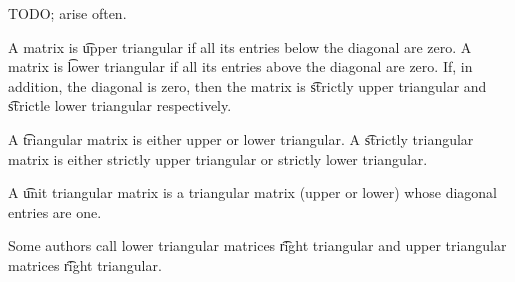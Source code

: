 
\sbasic































\sstart
{}


TODO;
arise often.


A matrix is \t{upper triangular} if all its entries below the diagonal are zero.
A matrix is \t{lower triangular} if all its entries above the diagonal are zero.
If, in addition, the diagonal is zero, then the matrix is \t{strictly upper triangular} and \t{strictle lower triangular} respectively.

A \t{triangular} matrix is either upper or lower triangular.
A \t{strictly triangular} matrix is either strictly upper triangular or strictly lower triangular.

A \t{unit triangular matrix} is a triangular matrix (upper or lower) whose diagonal entries are one.


Some authors call lower triangular matrices \t{right triangular} and upper triangular matrices \t{right triangular}.
\strats

